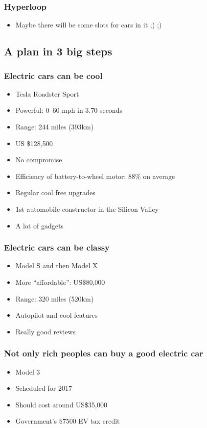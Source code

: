 \begin{frame}
\frametitle{Hyperloop}
\begin{itemize}
    \itemsep1.5em
    \item Maybe there will be some slots for cars in it ;) ;)
\end{itemize}
\end{frame}


\subsection{A plan in 3 big steps}

\begin{frame}
\frametitle{Electric cars can be cool}
\begin{itemize}
    \itemsep1em
    \item Tesla Roadster Sport
    \item Powerful: 0--60 mph in 3.70 seconds
    \item Range: 244 miles (393km)
    \item US \$128,500
    \item No compromise
\end{itemize}
\end{frame}

\begin{frame}
\begin{itemize}
    \itemsep1.5em
    \item Efficiency of battery-to-wheel motor: 88\% on average
    \item Regular cool free upgrades
    \item 1st automobile constructor in the Silicon Valley
    \item A lot of gadgets
\end{itemize}
\end{frame}

\begin{frame}
\frametitle{Electric cars can be classy}
\begin{itemize}
    \itemsep1.5em
    \item Model S and then Model X
    \item More ``affordable'': US\$80,000
    \item Range: 320 miles (520km)
    \item Autopilot and cool features
    \item Really good reviews
\end{itemize}
\end{frame}

\begin{frame}
\frametitle{Not only rich peoples can buy a good electric car}
\begin{itemize}
    \itemsep1.5em
    \item Model 3
    \item Scheduled for 2017
    \item Should cost around US\$35,000
    \item Government's \$7500 EV tax credit
\end{itemize}
\end{frame}
